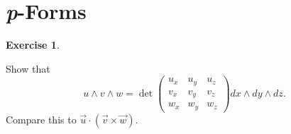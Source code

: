 \documentclass[11pt, a4paper]{report}
\theoremstyle{definition}
\newtheorem{exercise}{Exercise}[part]
\newenvironment{ex}{\begin{exercise}}{\end{exercise}\pagebreak[1]}
\begin{document}
\section{\emph{p}-Forms}

\begin{ex}\label{ex:triplewedgeproduct}

Show that
\[
    u \wedge v \wedge w = \det \begin{pmatrix}
            u_x & u_y & u_z \\
            v_x & v_y & v_z \\
            w_x & w_y & w_z
        \end{pmatrix} dx \wedge dy \wedge dz.
\]
Compare this to $\vec{u} \cdot (\vec{v} \times \vec{w})$.

\end{ex}
\end{document}
